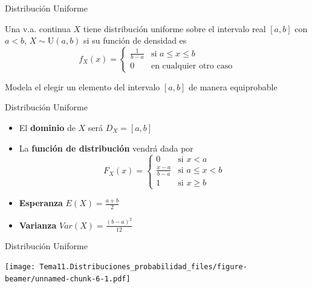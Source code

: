 \documentclass[
  ignorenonframetext,
]{beamer}
\begin{document}
\begin{frame}{Distribución Uniforme}
\protect\hypertarget{distribuciuxf3n-uniforme}{}

Una v.a. continua \(X\) tiene distribución uniforme sobre el intervalo
real \([a,b]\) con \(a<b\), \(X\sim\text{U}(a,b)\) si su función de
densidad es \[f_X(x)=\left\{
\begin{array}{rl}
     \frac{1}{b-a} & \text{si } a\le x\le b
  \\ 0 & \text{en cualquier otro caso}
\end{array}
\right.\]

Modela el elegir un elemento del intervalo \([a,b]\) de manera
equiprobable

\end{frame}

\begin{frame}{Distribución Uniforme}
\protect\hypertarget{distribuciuxf3n-uniforme-1}{}

\begin{itemize}
\item
  El \textbf{dominio} de \(X\) será \(D_X = [a,b]\)
\item
  La \textbf{función de distribución} vendrá dada por \[F_X(x)=\left\{
  \begin{array}{rl}
    0 & \text{si } x<a
  \\ \frac{x-a}{b-a} & \text{si } a\le x< b
  \\ 1 & \text{si } x\ge b
  \end{array}
  \right.\]
\item
  \textbf{Esperanza} \(E(X) = \frac{a+b}{2}\)
\item
  \textbf{Varianza} \(Var(X) = \frac{(b-a)^2}{12}\)
\end{itemize}

\end{frame}

\begin{frame}{Distribución Uniforme}
\protect\hypertarget{distribuciuxf3n-uniforme-2}{}

\texttt{[image: Tema11.Distribuciones\_probabilidad\_files/figure-beamer/unnamed-chunk-6-1.pdf]}

\end{frame}
\end{document}
